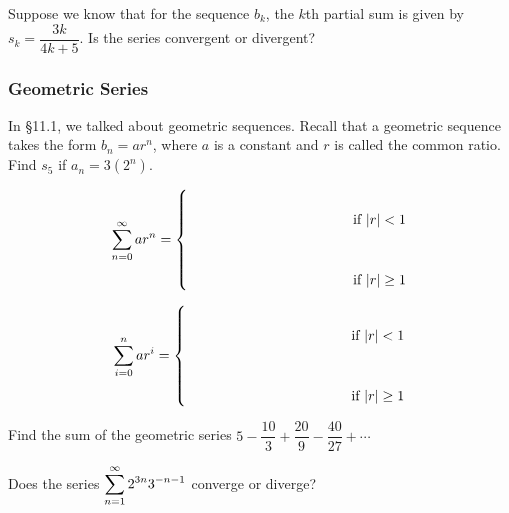 \documentclass[notes]{subfiles}
\begin{document}
		\begin{ex}
			Suppose we know that for the sequence $b_k$, the $k$th partial sum is given by $s_k = \dfrac{3k}{4k + 5}$.  Is the series convergent or divergent?
		\end{ex}
			
	\subsubsection*{Geometric Series}
		\begin{ex}
			In \S11.1, we talked about geometric sequences.  Recall that a geometric sequence takes the form $b_n =ar^n$, where $a$ is a constant and $r$ is called the common ratio.  Find $s_5$ if $a_n = 3(2^n)$.  
		\end{ex}
			\newpage
			
		\begin{rmk}
			\[\sum_{n=0}^\infty ar^n = \begin{cases} & \\ \hspace*{1.5in} & \text{if } |r| < 1\\ & \\ & \\ & \text{if }|r|\geq 1 \end{cases}\]
		\end{rmk}
		
		\begin{pf}
		
		\end{pf}
			
		\begin{rmk}
			\[\sum_{i=0}^n ar^i = \begin{cases} & \\ \hspace*{1.5in} & \text{if } |r| < 1\\ & \\ & \\ & \text{if }|r|\geq 1 \end{cases}\]
		\end{rmk}
			\newpage
			
		\begin{ex}
			Find the sum of the geometric series $5 - \dfrac{10}{3} + \dfrac{20}{9} - \dfrac{40}{27} + \cdots$
		\end{ex}
		
		\begin{ex}
			Does the series $\displaystyle \sum_{n=1}^\infty 2^{3n}3^{-n-1}$ converge or diverge?
		\end{ex}
			
\end{document}

